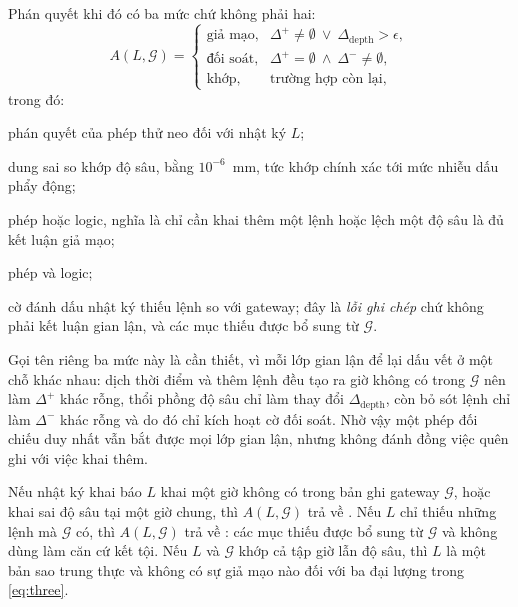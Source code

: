 Phán quyết khi đó có ba mức chứ không phải hai:
\begin{equation}
A(L,\mathcal{G})=
\begin{cases}
\text{giả mạo}, & \Delta^{+}\neq\emptyset\ \vee\ \Delta_{\mathrm{depth}}>\epsilon,\\
\text{đối soát}, & \Delta^{+}=\emptyset\ \wedge\ \Delta^{-}\neq\emptyset,\\
\text{khớp}, & \text{trường hợp còn lại},
\end{cases}
\label{eq:anchor}
\end{equation}
trong đó:
\begin{symbolist}
\item[$A(L,\mathcal{G})$] phán quyết của phép thử neo đối với nhật ký $L$;
\item[$\epsilon$] dung sai so khớp độ sâu, bằng $10^{-6}$~mm, tức khớp chính xác tới mức nhiễu dấu phẩy động;
\item[$\vee$] phép hoặc logic, nghĩa là chỉ cần khai thêm một lệnh hoặc lệch một độ sâu là đủ kết luận giả mạo;
\item[$\wedge$] phép và logic;
\item[\text{đối soát}] cờ đánh dấu nhật ký thiếu lệnh so với gateway; đây là \emph{lỗi ghi chép} chứ không phải kết luận gian lận, và các mục thiếu được bổ sung từ $\mathcal{G}$.
\end{symbolist}
Gọi tên riêng ba mức này là cần thiết, vì mỗi lớp gian lận để lại dấu vết ở một
chỗ khác nhau: dịch thời điểm và thêm lệnh đều tạo ra giờ không có trong
$\mathcal{G}$ nên làm $\Delta^{+}$ khác rỗng, thổi phồng độ sâu chỉ làm thay đổi
$\Delta_{\mathrm{depth}}$, còn bỏ sót lệnh chỉ làm $\Delta^{-}$ khác rỗng và do đó
chỉ kích hoạt cờ đối soát. Nhờ vậy một phép đối chiếu duy nhất vẫn bắt được mọi
lớp gian lận, nhưng không đánh đồng việc quên ghi với việc khai thêm.

\begin{proposition}
\label{prop:complete}
Nếu nhật ký khai báo $L$ khai một giờ không có trong bản ghi gateway
$\mathcal{G}$, hoặc khai sai độ sâu tại một giờ chung, thì $A(L,\mathcal{G})$ trả
về . Nếu $L$ chỉ thiếu những lệnh mà $\mathcal{G}$ có, thì
$A(L,\mathcal{G})$ trả về : các mục thiếu được bổ sung từ
$\mathcal{G}$ và không dùng làm căn cứ kết tội. Nếu $L$ và $\mathcal{G}$ khớp cả
tập giờ lẫn độ sâu, thì $L$ là một bản sao trung thực và không có sự giả mạo nào
đối với ba đại lượng trong \eqref{eq:three}.
\end{proposition}

